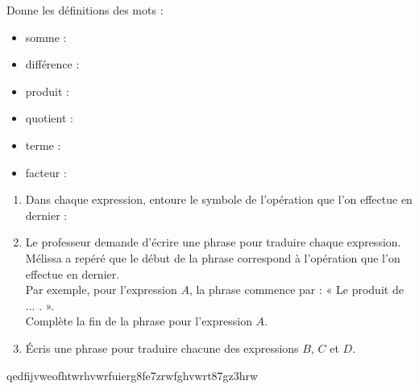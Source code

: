 \begin{methode*1}
\begin{exemple*1}

Donne les définitions des mots : 
\begin{itemize}
\item somme : \dotfill
\item différence :\dotfill
\item produit :\dotfill
\item quotient :\dotfill
\item terme :\dotfill
\item facteur :\dotfill
\end{itemize}
\end{exemple*1}

\exercice

\begin{enumerate}
\item
Dans chaque expression, entoure le symbole de l'opération que l'on effectue en dernier :


\item
Le professeur demande d'écrire une phrase pour traduire chaque expression. Mélissa a repéré que le début de la phrase correspond à l'opération que l'on effectue en dernier.\\
Par exemple, pour l'expression $A$, la phrase commence par : « Le produit de ... . ».\\
Complète la fin de la phrase pour l'expression $A$.


\item
Écris une phrase pour traduire chacune des expressions $B$, $C$ et $D$.

\end{enumerate}

\end{methode*1}

\prof
qedfijvweofhtwrhvwrfuierg8fe7zrwfghvwrt87gz3hrw